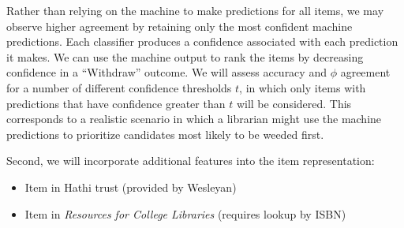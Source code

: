 \documentclass[man,11pt]{apa6}
\begin{document}
Rather than relying on the machine to make predictions for all items,
we may observe higher agreement by retaining only the most confident
machine predictions.  Each classifier produces a confidence associated
with each prediction it makes.  We can use the machine output to rank
the items by decreasing confidence in a ``Withdraw'' outcome.  We will
assess accuracy and $\phi$ agreement for a number of different
confidence thresholds $t$, in which only items with predictions that
have confidence greater than $t$ will be considered.  This corresponds
to a realistic scenario in which a librarian might use the machine
predictions to prioritize candidates most likely to be weeded first.

Second, we will incorporate additional features into the item
representation:
\begin{itemize}
\item Item in Hathi trust (provided by Wesleyan)
\item Item in {\em Resources for College Libraries} (requires lookup by ISBN)
\end{itemize}
\end{document}
